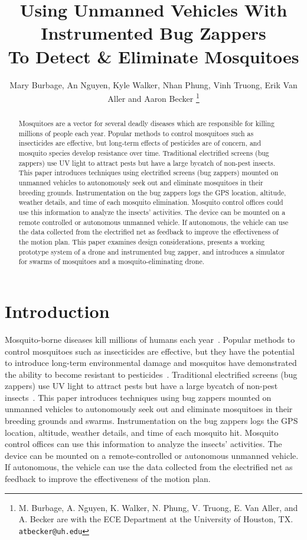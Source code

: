 \documentclass[letterpaper, 10 pt, conference]{ieeeconf}  %
\title{\LARGE \bf
Using Unmanned Vehicles With Instrumented Bug Zappers\\ To Detect \& Eliminate Mosquitoes
}
\author{Mary Burbage, An Nguyen, Kyle Walker, Nhan Phung, Vinh Truong, Erik Van Aller and Aaron Becker%
\thanks{M. Burbage, A. Nguyen, K. Walker, N. Phung, V. Truong, E. Van Aller, and A. Becker are with the ECE Department at the University of Houston, TX.
        {\tt\small atbecker@uh.edu}}%
}
\begin{document}
\maketitle
\thispagestyle{empty}
\pagestyle{empty}


\begin{abstract}
Mosquitoes are a vector for several deadly diseases which are responsible for killing millions of people each year.  Popular methods to control mosquitoes such as insecticides are effective, but long-term effects of pesticides are of concern, and mosquito species develop resistance over time.
Traditional electrified screens (bug zappers) use UV light to attract pests but have a large bycatch of non-pest insects. This paper introduces techniques using electrified screens (bug zappers) mounted on unmanned vehicles to autonomously seek out and eliminate mosquitoes in their breeding grounds. Instrumentation on the bug zappers logs the GPS location, altitude, weather details, and time of each mosquito elimination. Mosquito control offices could use this information to analyze the insects' activities. The device can be mounted on a remote controlled or autonomous unmanned vehicle. If autonomous, the vehicle can use the data collected from the electrified net as feedback to improve the effectiveness of the motion plan. 
This paper examines design considerations, presents a working prototype system of a drone and instrumented bug zapper, and introduces a simulator for swarms of mosquitoes and a mosquito-eliminating drone.  
\end{abstract}


\section{Introduction}

Mosquito-borne diseases kill millions of humans each year~\cite{murray2012global}. Popular methods to control mosquitoes such as insecticides are effective, but they have the potential to introduce long-term environmental damage and mosquitos have demonstrated the ability to become resistant to pesticides~\cite{ndiath2012resistance}. Traditional electrified screens (bug zappers) use UV light to attract pests but have a large bycatch of non-pest insects~\cite{University-Of-Florida1997}. This paper introduces techniques using bug zappers mounted on unmanned vehicles to autonomously seek out and eliminate mosquitoes in their breeding grounds and swarms. Instrumentation on the bug zappers logs the GPS location, altitude, weather details, and time of each mosquito hit.  Mosquito control offices can use this information to analyze the insects' activities. The device can be mounted on a remote-controlled or autonomous unmanned vehicle. If autonomous, the vehicle can use the data collected from the electrified net as feedback to improve the effectiveness of the motion plan. 
\end{document}
